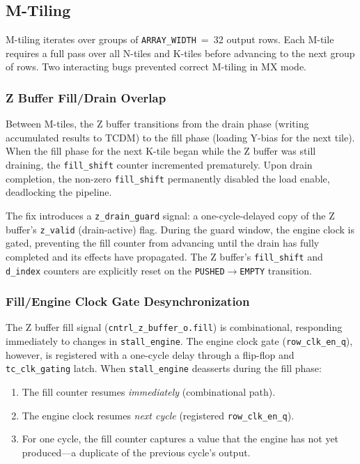 \subsection{M-Tiling}
\label{sec:m-tiling}

M-tiling iterates over groups of \texttt{ARRAY\_WIDTH}~=~32 output rows. Each
M-tile requires a full pass over all N-tiles and K-tiles before advancing to the
next group of rows. Two interacting bugs prevented correct M-tiling in MX mode.

\subsubsection{Z Buffer Fill/Drain Overlap}
\label{ssec:z-drain-overlap}

Between M-tiles, the Z buffer transitions from the drain phase (writing
accumulated results to TCDM) to the fill phase (loading Y-bias for the next
tile). When the fill phase for the next K-tile began while the Z buffer was
still draining, the \texttt{fill\_shift} counter incremented prematurely. Upon
drain completion, the non-zero \texttt{fill\_shift} permanently disabled the
load enable, deadlocking the pipeline.

The fix introduces a \texttt{z\_drain\_guard} signal: a one-cycle-delayed copy
of the Z buffer's \texttt{z\_valid} (drain-active) flag. During the guard
window, the engine clock is gated, preventing the fill counter from advancing
until the drain has fully completed and its effects have propagated. The Z
buffer's \texttt{fill\_shift} and \texttt{d\_index} counters are explicitly
reset on the \texttt{PUSHED}$\to$\texttt{EMPTY} transition.


\subsubsection{Fill/Engine Clock Gate Desynchronization}
\label{ssec:fill-engine-desync}

The Z buffer fill signal (\texttt{cntrl\_z\_buffer\_o.fill}) is combinational,
responding immediately to changes in \texttt{stall\_engine}. The engine clock
gate (\texttt{row\_clk\_en\_q}), however, is registered with a one-cycle delay
through a flip-flop and \texttt{tc\_clk\_gating} latch. When
\texttt{stall\_engine} deasserts during the fill phase:

\begin{enumerate}
    \item The fill counter resumes \emph{immediately} (combinational path).
    \item The engine clock resumes \emph{next cycle} (registered
          \texttt{row\_clk\_en\_q}).
    \item For one cycle, the fill counter captures a value that the engine has
          not yet produced---a duplicate of the previous cycle's output.
\end{enumerate}

